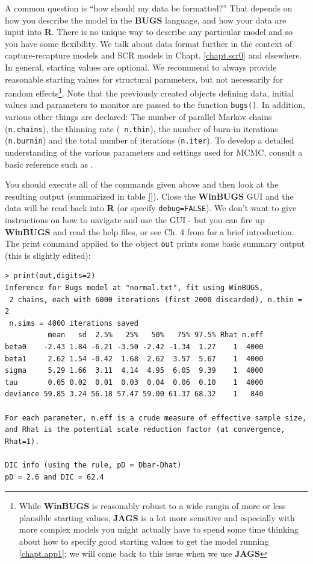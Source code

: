 A common question is ``how should my data be formatted?'' That depends
on how you describe the model in the {\bf BUGS} language, and how your
data are input into {\bf R}.  There is no unique way to describe any
particular model and so you have some flexibility. We talk about data
format further in the context of capture-recapture models and SCR
models in Chapt. \ref{chapt.scr0} and elsewhere.  In general, starting
values are optional. We recommend to always provide reasonable
starting values for structural parameters, but not necessarily for
random effects\footnote{While {\bf WinBUGS} is reasonably robust to a
  wide rangin of more or less plausible starting values, {\bf JAGS} is
  a lot more sensitive and especially with more complex models you
  might actually have to spend some time thinking about how to specify
  good starting values to get the model running \ref{chapt.app1}; we
  will come back to this issue when we use {\bf JAGS}}.  Note that the
previously created objects defining data, initial values and
parameters to monitor are passed to the function \mbox{\tt bugs()}.
In addition, various other things are declared: The number of parallel
Markov chains (\mbox{\tt n.chains}), the thinning rate (\mbox{\tt
  n.thin}), the number of burn-in iterations (\mbox{\tt n.burnin}) and
the total number of iterations (\mbox{\tt n.iter}).  To develop a
detailed understanding of the various parameters and settings used for
MCMC, consult a basic reference such as \citet{kery:2010}.



You should execute all of the commands given above and then look at
the resulting output (summarized in table \ref{}). Close the {\bf WinBUGS} GUI and the data will be
read back into {\bf R} (or specify \mbox{\tt debug=FALSE}).  We don't
want to give instructions on how to navigate and use the GUI - but you
can fire up {\bf WinBUGS} and read the help files, or see Ch. 4 from
\citet{kery:2010} for a brief introduction.
The print command applied to the object \mbox{\tt out} prints some
basic summary output (this is slightly edited):

{\small
\begin{verbatim}
> print(out,digits=2)
Inference for Bugs model at "normal.txt", fit using WinBUGS,
 2 chains, each with 6000 iterations (first 2000 discarded), n.thin = 2
 n.sims = 4000 iterations saved
          mean   sd  2.5%   25%   50%   75% 97.5% Rhat n.eff
beta0    -2.43 1.84 -6.21 -3.50 -2.42 -1.34  1.27    1  4000
beta1     2.62 1.54 -0.42  1.68  2.62  3.57  5.67    1  4000
sigma     5.29 1.66  3.11  4.14  4.95  6.05  9.39    1  4000
tau       0.05 0.02  0.01  0.03  0.04  0.06  0.10    1  4000
deviance 59.85 3.24 56.18 57.47 59.00 61.37 68.32    1   840

For each parameter, n.eff is a crude measure of effective sample size,
and Rhat is the potential scale reduction factor (at convergence, Rhat=1).

DIC info (using the rule, pD = Dbar-Dhat)
pD = 2.6 and DIC = 62.4
\end{verbatim}
}

